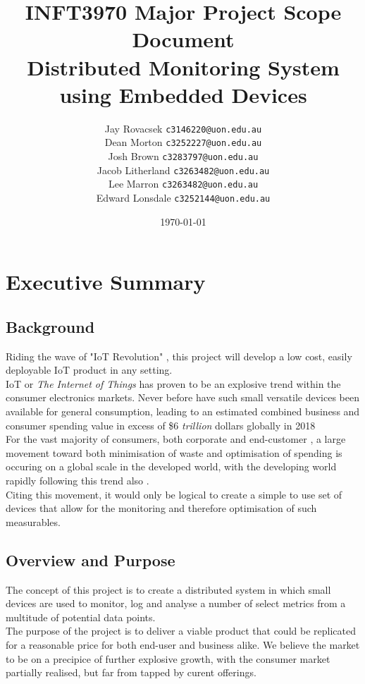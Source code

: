 \documentclass{article}
\title{INFT3970 Major Project Scope Document \protect\\
    Distributed Monitoring System using Embedded Devices}
\author{
        Jay Rovacsek
        \texttt{c3146220@uon.edu.au}\\
        Dean Morton
        \texttt{c3252227@uon.edu.au}\\
        Josh Brown
        \texttt{c3283797@uon.edu.au}\\
        Jacob Litherland
        \texttt{c3263482@uon.edu.au}\\
        Lee Marron
        \texttt{c3263482@uon.edu.au}\\
        Edward Lonsdale
        \texttt{c3252144@uon.edu.au}
    }
\date{\today}
\begin{document}
    \begin{titlingpage}
        \maketitle
    \end{titlingpage}
    \newpage
    \tableofcontents
    \newpage
    
    \section*{Executive Summary}
    \vspace{10mm}
        \subsection{Background}
            Riding the wave of "IoT Revolution" \cite{Forbes}, this project will develop
            a low cost, easily deployable IoT product in any setting.
            \\
            IoT or \textit{The Internet of Things} has proven to be an explosive trend within
            the consumer electronics markets. Never before have such small versatile devices been
            available for general consumption, leading to an estimated combined business and
            consumer spending value in excess of \$6 \textit{trillion} dollars globally in 2018 \cite{Forbes}
            \\
            For the vast majority of consumers, both corporate and end-customer \cite{Mckinsey}, a large 
            movement toward both minimisation of waste and optimisation of spending is occuring
            on a global scale in the developed world, with the developing world rapidly following 
            this trend also \cite{SunNews}.
            \\
            Citing this movement, it would only be logical to create a simple to use set of devices 
            that allow for the monitoring and therefore optimisation of such measurables.
        \vspace{10mm}
        \subsection{Overview and Purpose}
            The concept of this project is to create a distributed system in which small 
            devices are used to monitor, log and analyse a number of select metrics from a 
            multitude of potential data points.
            \\
            The purpose of the project is to deliver a viable product that could be replicated
            for a reasonable price for both end-user and business alike. We believe the market to
            be on a precipice of further explosive growth, with the consumer market partially
            realised, but far from tapped by curent offerings.
\end{document}
